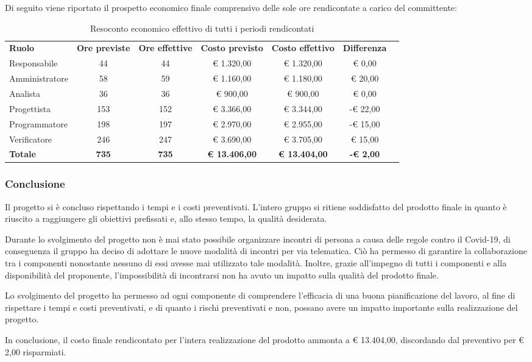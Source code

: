 \documentclass[../piano-di-progetto.tex]{subfiles}
\begin{document}
  Di seguito viene riportato il prospetto economico finale comprensivo delle sole ore rendicontate a carico del committente:
    \begin{table}[H]
    \centering
    \begin{tabular}{lcccccc}
      \rowcolor{lightgray}
      \textbf{Ruolo}  & \textbf{Ore previste} & \textbf{Ore effettive} & \textbf{Costo previsto} & \textbf{Costo effettivo} & \textbf{Differenza} \\
Responsabile    & 44           & 44           & € 1.320,00           & € 1.320,00           & € 0,00           \\
Amministratore  & 58           & 59           & € 1.160,00           & € 1.180,00           & € 20,00          \\
Analista        & 36           & 36           & € 900,00             & € 900,00             & € 0,00           \\
Progettista     & 153          & 152          & € 3.366,00           & € 3.344,00           & -€ 22,00         \\
Programmatore   & 198          & 197          & € 2.970,00           & € 2.955,00           & -€ 15,00         \\
Verificatore    & 246          & 247          & € 3.690,00           & € 3.705,00           & € 15,00          \\
\textbf{Totale} & \textbf{735} & \textbf{735} & \textbf{€ 13.406,00} & \textbf{€ 13.404,00} & \textbf{-€ 2,00}
      
    \end{tabular}
    \caption{Resoconto economico effettivo di tutti i periodi rendicontati}
  \end{table}
  
  \subsubsection{Conclusione}
  Il progetto si è concluso rispettando i tempi e i costi preventivati. L'intero gruppo si ritiene soddisfatto del prodotto finale in quanto è riuscito a raggiungere gli obiettivi prefissati e, allo stesso tempo, la qualità desiderata.
  
  Durante lo svolgimento del progetto non è mai stato possibile organizzare incontri di persona a causa delle regole contro il Covid-19, di conseguenza il gruppo ha deciso di adottare le nuove modalità di incontri per via telematica. Ciò ha permesso di garantire la collaborazione tra i componenti nonostante nessuno di essi avesse mai utilizzato tale modalità. Inoltre, grazie all'impegno di tutti i componenti e alla disponibilità del proponente, l'impossibilità di incontrarsi non ha avuto un impatto sulla qualità del prodotto finale.
  
  Lo svolgimento del progetto ha permesso ad ogni componente di comprendere l'efficacia di una buona pianificazione del lavoro, al fine di rispettare i tempi e costi preventivati, e di quanto i rischi preventivati e non, possano avere un impatto importante sulla realizzazione del progetto.
  
  In conclusione, il costo finale rendicontato per l'intera realizzazione del prodotto ammonta a € 13.404,00, discordando dal preventivo per € 2,00 risparmiati.
  
\end{document}
